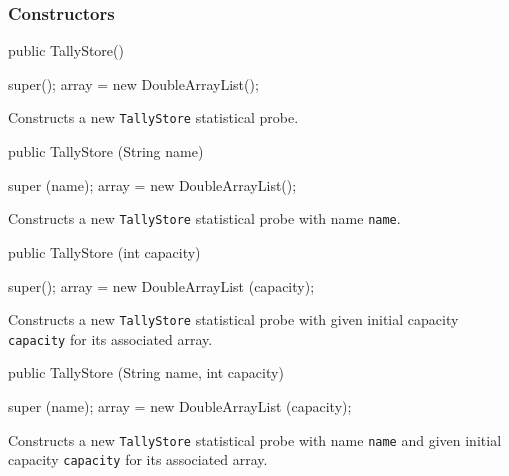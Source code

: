 \subsubsection* {Constructors}
\begin{code}

   public TallyStore() \begin{hide} {
      super();
      array = new DoubleArrayList();
   }\end{hide}
\end{code}
\begin{tabb}  Constructs a new \texttt{TallyStore} statistical probe.
\end{tabb}
\begin{code}

   public TallyStore (String name) \begin{hide} {
      super (name);
      array = new DoubleArrayList();
   }\end{hide}
\end{code}
\begin{tabb}  Constructs a new \texttt{TallyStore} statistical probe with name \texttt{name}.
\end{tabb}
\begin{htmlonly}
\end{htmlonly}
\begin{code}

   public TallyStore (int capacity) \begin{hide} {
      super();
      array = new DoubleArrayList (capacity);
   }\end{hide}
\end{code}
\begin{tabb}  Constructs a new \texttt{TallyStore} statistical probe
    with given initial capacity \texttt{capacity} for its associated array.
\end{tabb}
\begin{htmlonly}
\end{htmlonly}
\begin{code}

   public TallyStore (String name, int capacity) \begin{hide} {
      super (name);
      array = new DoubleArrayList (capacity);
   }\end{hide}
\end{code}
\begin{tabb}  Constructs a new \texttt{TallyStore} statistical probe with
name \texttt{name} and given initial capacity \texttt{capacity} for its
 associated array.
\end{tabb}

